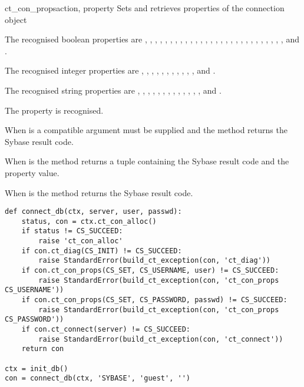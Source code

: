 \begin{methoddesc}[CS_CONNECTION]{ct_con_props}{action, property }
Sets and retrieves properties of the connection object

The recognised boolean properties are ,
, ,
, ,
, , ,
, ,
, ,
, ,
, ,
, ,
, ,
, ,
, ,
, ,
, ,
and .

The recognised integer properties are ,
, , ,
, , ,
, , ,
, and .

The recognised string properties are ,
, , ,
, , ,
, ,
, ,
, , and
.

The  property  is recognised.

When  is  a compatible  argument
must be supplied and the method returns the Sybase result code.

When  is  the method returns a tuple
containing the Sybase result code and the property value.

When  is  the method returns the Sybase
result code.

\begin{verbatim}
def connect_db(ctx, server, user, passwd):
    status, con = ctx.ct_con_alloc()
    if status != CS_SUCCEED:
    	raise 'ct_con_alloc'
    if con.ct_diag(CS_INIT) != CS_SUCCEED:
    	raise StandardError(build_ct_exception(con, 'ct_diag'))
    if con.ct_con_props(CS_SET, CS_USERNAME, user) != CS_SUCCEED:
    	raise StandardError(build_ct_exception(con, 'ct_con_props CS_USERNAME'))
    if con.ct_con_props(CS_SET, CS_PASSWORD, passwd) != CS_SUCCEED:
    	raise StandardError(build_ct_exception(con, 'ct_con_props CS_PASSWORD'))
    if con.ct_connect(server) != CS_SUCCEED:
    	raise StandardError(build_ct_exception(con, 'ct_connect'))
    return con

ctx = init_db()
con = connect_db(ctx, 'SYBASE', 'guest', '')
\end{verbatim}
\end{methoddesc}

